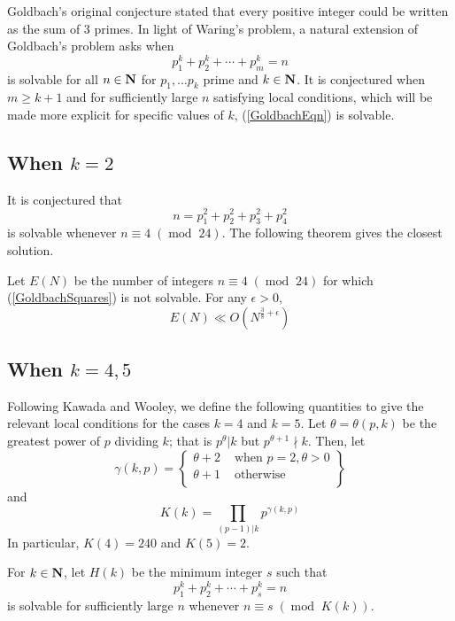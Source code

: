 Goldbach's original conjecture stated that every positive integer could be written as the sum of $3$ primes. In light of Waring's problem, a natural extension of Goldbach's problem asks when
\begin{equation}
    p_1^k+p_2^k+\cdots+p_m^k=n\label{GoldbachEqn}
\end{equation}
is solvable for all $n\in\mathbf{N}$ for $p_1,\dots p_k$ prime and $k\in\mathbf{N}$. It is conjectured when $m\ge k+1$ and for sufficiently large $n$ satisfying local conditions, which will be made more explicit for specific values of $k$, (\ref{GoldbachEqn}) is solvable.

\subsection{When $k=2$}

It is conjectured that
\begin{equation}
n=p_1^2+p_2^2+p_3^2+p_4^2 \label{GoldbachSquares}
\end{equation}
is solvable whenever $n\equiv 4\;(\operatorname{mod}\; 24)$. The following theorem gives the closest solution.

\begin{theorem}
    Let $E(N)$ be the number of integers $n\equiv 4\;(\operatorname{mod}\; 24)$ for which (\ref{GoldbachSquares}) is not solvable. For any $\epsilon>0$,
    $$E(N)\ll O(N^{\frac38+\epsilon})$$
\end{theorem}

\subsection{When $k=4,5$}

Following Kawada and Wooley, we define the following quantities to give the relevant local conditions for the cases $k=4$ and $k=5$. Let $\theta=\theta(p,k)$ be the greatest power of $p$ dividing $k$; that is $p^\theta|k$ but $p^{\theta+1}\nmid k$. Then, let
\[ \gamma(k,p)=\left\{\begin{matrix}
\theta+2 & \text{ when } p=2, \theta>0  \\
\theta+1 & \text{ otherwise}  \\
\end{matrix}\right\}\]
and
$$K(k)=\prod_{(p-1)|k}p^{\gamma(k,p)}$$
In particular, $K(4)=240$ and $K(5)=2$.

\begin{definition}
    For $k\in\mathbf{N}$, let $H(k)$ be the minimum integer $s$ such that
    $$p_1^k+p_2^k+\cdots+p_s^k=n$$
    is solvable for sufficiently large $n$ whenever $n\equiv s\;(\operatorname{mod}\; K(k))$.
\end{definition}


